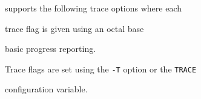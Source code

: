  supports the following trace options where each


trace flag is given using an octal base


\begin{optlist}


    basic progress reporting.


\end{optlist}


Trace flags are set using the \texttt{-T} option or the  \texttt{TRACE} 


configuration variable.




